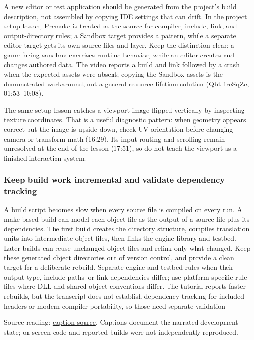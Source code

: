 A new editor or test application should be generated from the project's build description, not assembled by copying IDE settings that can drift. In the project setup lesson, Premake is treated as the source for compiler, include, link, and output-directory rules; a Sandbox target provides a pattern, while a separate editor target gets its own source files and layer. Keep the distinction clear: a game-facing sandbox exercises runtime behavior, while an editor creates and changes authored data. The video reports a build and link followed by a crash when the expected assets were absent; copying the Sandbox assets is the demonstrated workaround, not a general resource-lifetime solution (\href{https://www.youtube.com/watch?v=Qbt-1rcSqZc}{Qbt-1rcSqZc}, 01:53--10:08).

The same setup lesson catches a viewport image flipped vertically by inspecting texture coordinates. That is a useful diagnostic pattern: when geometry appears correct but the image is upside down, check UV orientation before changing camera or transform math (16:29). Its input routing and scrolling remain unresolved at the end of the lesson (17:51), so do not teach the viewport as a finished interaction system.

\subsubsection{Keep build work incremental and validate dependency tracking}\label{05-engine-i-ch013-keep-build-work-incremental-and-validate-dependency-tracking}

A build script becomes slow when every source file is compiled on every run. A make-based build can model each object file as the output of a source file plus its dependencies. The first build creates the directory structure, compiles translation units into intermediate object files, then links the engine library and testbed. Later builds can reuse unchanged object files and relink only what changed. Keep these generated object directories out of version control, and provide a clean target for a deliberate rebuild. Separate engine and testbed rules when their output type, include paths, or link dependencies differ; use platform-specific rule files where DLL and shared-object conventions differ. The tutorial reports faster rebuilds, but the transcript does not establish dependency tracking for included headers or modern compiler portability, so those need separate validation.

Source reading: \href{https://www.youtube.com/watch?v=WR0tAQj-og8}{caption source}. Captions document the narrated development state; on-screen code and reported builds were not independently reproduced.


